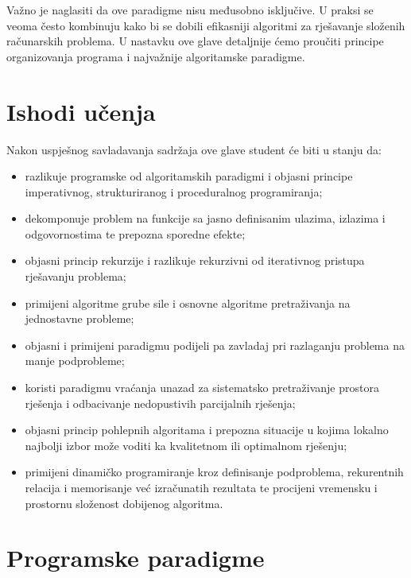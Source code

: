 Važno je naglasiti da ove paradigme nisu međusobno isključive. U praksi se veoma često kombinuju kako bi se dobili efikasniji algoritmi za rješavanje složenih računarskih problema. U nastavku ove glave detaljnije ćemo proučiti principe organizovanja programa i najvažnije algoritamske paradigme.

\section*{Ishodi učenja}

Nakon uspješnog savladavanja sadržaja ove glave student će biti u stanju da:

\begin{itemize}
	\item razlikuje programske od algoritamskih paradigmi i objasni principe imperativnog, strukturiranog i proceduralnog programiranja;
	\item dekomponuje problem na funkcije sa jasno definisanim ulazima, izlazima i odgovornostima te prepozna sporedne efekte;
	\item objasni princip rekurzije i razlikuje rekurzivni od iterativnog pristupa rješavanju problema;
	
	\item primijeni algoritme grube sile i osnovne algoritme pretraživanja	na jednostavne probleme;
	
	\item objasni i primijeni paradigmu podijeli pa zavladaj pri razlaganju problema na manje podprobleme;
	
	\item koristi paradigmu vraćanja unazad za sistematsko pretraživanje prostora rješenja i odbacivanje nedopustivih parcijalnih rješenja;
	
	\item objasni princip pohlepnih algoritama i prepozna situacije u kojima lokalno najbolji izbor može voditi ka kvalitetnom ili optimalnom rješenju;
	
	\item primijeni dinamičko programiranje kroz definisanje podproblema,
	rekurentnih relacija i memorisanje već izračunatih rezultata te procijeni
	vremensku i prostornu složenost dobijenog algoritma.
\end{itemize}



\section{Programske paradigme}
\label{sec:programske-paradigme}

